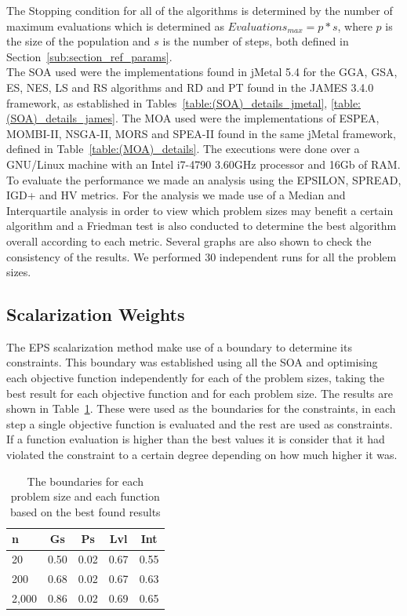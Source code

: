 The Stopping condition for all of the algorithms is determined by the number of maximum evaluations which is determined as $Evaluations_{max} = p * s$, where $p$ is the size of the population and $s$ is the number of steps, both defined in Section~\ref{sub:section_ref_params}.\\

The SOA used were the implementations found in jMetal 5.4 for the GGA, GSA, ES, NES, LS and RS algorithms and RD and PT found in the JAMES 3.4.0 framework, as established in Tables~\ref{table:(SOA)_details_jmetal}, \ref{table:(SOA)_details_james}. The MOA used were the implementations of ESPEA, MOMBI-II, NSGA-II, MORS and SPEA-II found in the same jMetal framework, defined in Table~\ref{table:(MOA)_details}. The executions were done over a GNU/Linux machine with an Intel i7-4790 3.60GHz processor and 16Gb of RAM.\\

To evaluate the performance we made an analysis using the EPSILON, SPREAD, IGD+ and HV metrics. For the analysis we made use of a Median and Interquartile analysis in order to view which problem sizes may benefit a certain algorithm and a Friedman test is also conducted to determine the best algorithm overall according to each metric. Several graphs are also shown to check the consistency of the results. We performed 30 independent runs for all the problem sizes.\\

\subsection{Scalarization Weights}

The EPS scalarization method make use of a boundary to determine its constraints. This boundary was established using all the SOA and optimising each objective function independently for each of the problem sizes, taking the best result for each objective function and for each problem size. The results are shown in Table~\ref{tab:best_independant_results}. These were used as the boundaries for the constraints, in each step a single objective function is evaluated and the rest are used as constraints. If a function evaluation is higher than the best values it is consider that it had violated the constraint to a certain degree depending on how much higher it was.\\

\begin{table}[!htp]
\centering
\begin{tabular}{lcccc}
\hline
n     & Gs   & Ps   & Lvl  & Int  \\ \hline
20    & 0.50 & 0.02 & 0.67 & 0.55 \\
200   & 0.68 & 0.02 & 0.67 & 0.63 \\
2,000 & 0.86 & 0.02 & 0.69 & 0.65 \\ \hline
\end{tabular}%
\caption{The boundaries for each problem size and each function based on the best found results}
\label{tab:best_independant_results}
\end{table}

